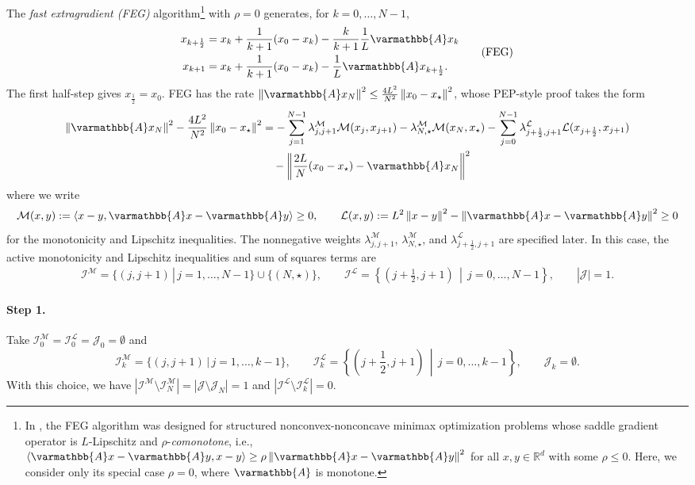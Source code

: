 \documentclass{article}
\theoremstyle{definition}
\theoremstyle{plain}
\newcommand{\cI}{{\mathcal{I}}}
\newcommand{\cJ}{{\mathcal{J}}}
\newcommand{\cL}{{\mathcal{L}}}
\newcommand{\cM}{{\mathcal{M}}}
\newcommand{\reals}{\mathbb{R}}
\newcommand{\opA}{{\varmathbb{A}}}
\newcommand{\inprod}[2]{\left\langle #1,#2 \right\rangle}
\newcommand{\sqnorm}[1]{\left\| #1 \right\|^2}
\begin{document}
The \textit{fast extragradient (FEG)} algorithm\footnote{In \citep{LeeKim2021_fast}, the FEG algorithm was designed for structured nonconvex-nonconcave minimax optimization problems whose saddle gradient operator is $L$-Lipschitz and $\rho$-\textit{comonotone}, i.e., $\inprod{\opA x - \opA y}{x-y} \ge \rho \sqnorm{\opA x - \opA y}$ for all $x,y\in\reals^d$ with some $\rho \le 0$.
Here, we consider only its special case $\rho=0$, where $\opA$ is monotone.} with $\rho=0$ \citep{LeeKim2021_fast} generates, for $k=0,\dots,N-1$,
\begin{align}
\begin{aligned}
    x_{k+\frac12} &= x_k+\frac{1}{k+1}(x_0-x_k)-\frac{k}{k+1}\frac{1}{L}\opA x_k \\
    x_{k+1} &= x_k+\frac{1}{k+1}(x_0-x_k)-\frac{1}{L}\opA x_{k+\frac12} .
\end{aligned}
\label{alg:feg}
\tag{FEG}
\end{align}
The first half-step gives $x_{\frac12}=x_0$.
FEG has the rate $\sqnorm{\opA x_N} \le \frac{4L^2}{N^2}\sqnorm{x_0-x_\star}$, 
whose PEP-style proof takes the form
\begin{align}
\begin{aligned}
    \sqnorm{\opA x_N}-\frac{4L^2}{N^2}\sqnorm{x_0-x_\star} 
    &= -\sum_{j=1}^{N-1}\lambda^\cM_{j,j+1}\cM(x_j,x_{j+1})
    -\lambda^\cM_{N,\star}\cM(x_N,x_\star)
    -\sum_{j=0}^{N-1}\lambda^\cL_{j+\frac12,j+1}\cL(x_{j+\frac12},x_{j+1}) \\
    &\quad
    -\sqnorm{\frac{2L}{N}(x_0-x_\star)-\opA x_N} 
\end{aligned}
\label{eq:feg_full_pep_certificate}
\end{align}
where we write
\[
    \cM(x,y) := \inprod{x-y}{\opA x-\opA y} \ge 0,
    \qquad
    \cL(x,y) := L^2\sqnorm{x-y} - \sqnorm{\opA x - \opA y} \ge 0
\]
for the monotonicity and Lipschitz inequalities. 
The nonnegative weights $\lambda^\cM_{j,j+1}$, $\lambda^\cM_{N,\star}$, and $\lambda^\cL_{j+\frac12,j+1}$ are specified later.
In this case, the active monotonicity and Lipschitz inequalities and sum of squares terms are
\[
    \begin{aligned}
    \cI^\cM = \{(j,j+1)\,|\,j=1,\dots,N-1\}\cup\{(N,\star)\},    
    \qquad
    \cI^\cL = \left\{\left(j+\frac12,j+1\right)\,\middle|\,j=0,\dots,N-1 \right\},
    \qquad
    |\cJ|=1.
    \end{aligned}
\]

\paragraph{Step 1.}
Take $\cI_0^\cM=\cI_0^\cL=\cJ_0=\emptyset$ and 
\[
    \cI_k^\cM = \{(j,j+1)\,|\,j=1,\dots,k-1\},
    \qquad
    \cI_k^\cL = \left\{\left(j+\frac12, j+1\right)\,\middle|\,j=0,\dots,k-1 \right\},
    \qquad
    \cJ_k=\emptyset .
\]
With this choice, we have $|\cI^\cM \setminus \cI^\cM_N| = |\cJ \setminus \cJ_N| = 1$ and $|\cI^\cL \setminus \cI^\cL_k| = 0$.
\end{document}
